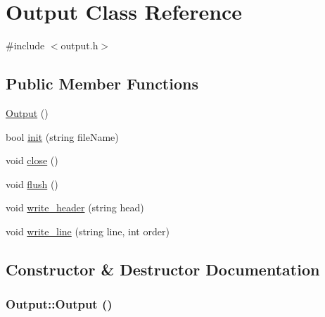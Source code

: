 \hypertarget{classOutput}{
\section{Output Class Reference}
\label{classOutput}
}


{\ttfamily \#include $<$output.h$>$}

\subsection*{Public Member Functions}
\begin{DoxyCompactItemize}
\item 
\hyperlink{classOutput_a428c663520336477a12f1a33504eb067}{Output} ()
\item 
bool \hyperlink{classOutput_a5622f8a5844d8a705d16c91abe4e3fa3}{init} (string fileName)
\item 
void \hyperlink{classOutput_a8ad983d5d1526a180e3a9cdb005b4198}{close} ()
\item 
void \hyperlink{classOutput_a0e201407bdd9555b8618575ce155ca20}{flush} ()
\item 
void \hyperlink{classOutput_ac8c48b57590c89dcd7993c8497ddde23}{write\_\-header} (string head)
\item 
void \hyperlink{classOutput_a616ea937fe1d9b04fcd60cbd4797e3c4}{write\_\-line} (string line, int order)
\end{DoxyCompactItemize}


\subsection{Constructor \& Destructor Documentation}
\hypertarget{classOutput_a428c663520336477a12f1a33504eb067}{
\subsubsection[{Output}]{\setlength{\rightskip}{0pt plus 5cm}Output::Output ()}}
\label{classOutput_a428c663520336477a12f1a33504eb067}


